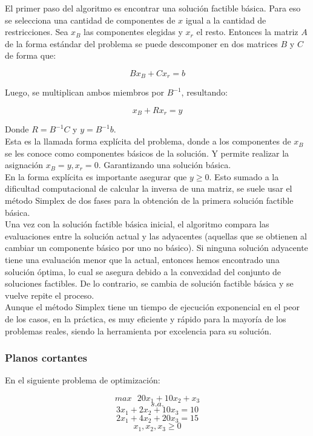 \documentclass[runningheads]{llncs}
\begin{document}
El primer paso del algoritmo es encontrar una solución factible básica. Para eso se selecciona una cantidad de componentes de $x$ igual a la cantidad de restricciones. Sea $x_B$ las componentes elegidas y $x_r$ el resto. Entonces la matriz $A$ de la forma estándar del problema se puede descomponer en dos matrices $B$ y $C$ de forma que:

$$Bx_B+Cx_r=b$$

Luego, se multiplican ambos miembros por $B^{-1}$, resultando:

$$x_B+Rx_r=y$$

Donde $R=B^{-1}C$ y $y=B^{-1}b$.\\

Esta es la llamada forma explícita del problema, donde a los componentes de $x_B$ se les conoce como componentes básicos de la solución. Y permite realizar la asignación $x_B=y, x_r=0$. Garantizando una solución básica. \\

En la forma explícita es importante asegurar que $y\geq 0$. Esto sumado a la dificultad computacional de calcular la inversa de una matriz, se suele usar el método Simplex de dos fases para la obtención de la primera solución factible básica.\\

Una vez con la solución factible básica inicial, el algoritmo compara las evaluaciones entre la solución actual y las adyacentes (aquellas que se obtienen al cambiar un componente básico por uno no básico). Si ninguna solución adyacente tiene una evaluación menor que la actual, entonces hemos encontrado una solución óptima, lo cual se asegura debido a la convexidad del conjunto de soluciones factibles. De lo contrario, se cambia de solución factible básica y se vuelve repite el proceso.\\

Aunque el método Simplex tiene un tiempo de ejecución exponencial en el peor de los casos, en la práctica, es muy eficiente y rápido para la mayoría de los problemas reales, siendo la herramienta por excelencia para su solución. 

\subsubsection{Planos cortantes\\}

En el siguiente problema de optimización:

$$max \text{ } 20x_1+10x_2+x_3$$
$$s.a.$$
$$3x_1+2x_2+10x_3=10$$
$$2x_1+4x_2+20x_3=15$$
$$x_1,x_2,x_3\geq 0$$\\
\end{document}

